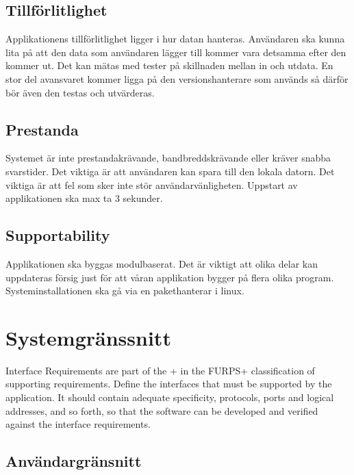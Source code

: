 \subsection{Tillförlitlighet} 
Applikationens tillförlitlighet ligger i hur datan hanteras. Användaren ska kunna lita på att den data som användaren lägger till kommer vara detsamma efter den kommer ut. Det kan mätas med tester på skillnaden mellan in och utdata. En stor del avansvaret kommer ligga på den versionshanterare som används så därför bör även den testas och utvärderas.

\subsection{Prestanda}
Systemet är inte prestandakrävande, bandbreddskrävande eller kräver snabba svarstider. Det viktiga är att användaren kan spara till den lokala datorn. Det viktiga är att fel som sker inte stör användarvänligheten. Uppstart av applikationen ska max ta 3 sekunder.

\subsection{Supportability} %
Applikationen ska byggas modulbaserat. Det är viktigt att olika delar kan uppdateras försig just för att våran applikation bygger på flera olika program. Systeminstallationen ska gå via en pakethanterar i linux. 


\section{Systemgränssnitt}

Interface Requirements are part of the + in the FURPS+ classification of supporting requirements. Define the interfaces that must be supported by the application. It should contain adequate specificity, protocols, ports and logical addresses, and so forth, so that the software can be developed and verified against the interface requirements.

\subsection{Användargränsnitt}

